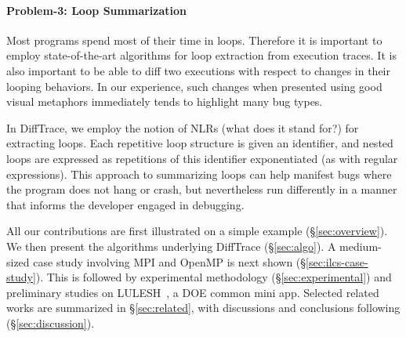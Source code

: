 \paragraph{Problem-3: Loop Summarization\/}
Most programs spend most of their time in loops.
%
Therefore it is important to employ state-of-the-art algorithms for
loop extraction from execution traces.
%
It is also important
to be able to diff two executions with respect to changes in their looping behaviors.
%
In our experience, such changes when presented using good visual metaphors
immediately tends to highlight many bug types.


In DiffTrace, we employ the notion of NLRs (what does it stand for?) for
extracting loops.
%
Each repetitive loop structure is given an identifier, and nested loops are
expressed as repetitions of this identifier exponentiated (as with regular
expressions).
%
This approach to summarizing loops can help manifest
bugs where the program does not hang or crash, but nevertheless
run differently in a manner that informs the developer engaged in debugging.

All our contributions are first
illustrated on a simple example (\S\ref{sec:overview}).
%
We then present the algorithms underlying DiffTrace (\S\ref{sec:algo}).
%
A medium-sized case study involving MPI and OpenMP is next shown (\S\ref{sec:ilcs-case-study}).
%
This is followed by experimental methodology (\S\ref{sec:experimental})
and preliminary studies on LULESH~\cite{lulesh}, 
a DOE common mini app.
%
Selected related works are summarized in \S\ref{sec:related}, with
discussions and conclusions following (\S\ref{sec:discussion}).

% 
% 
% 
% 
% 



